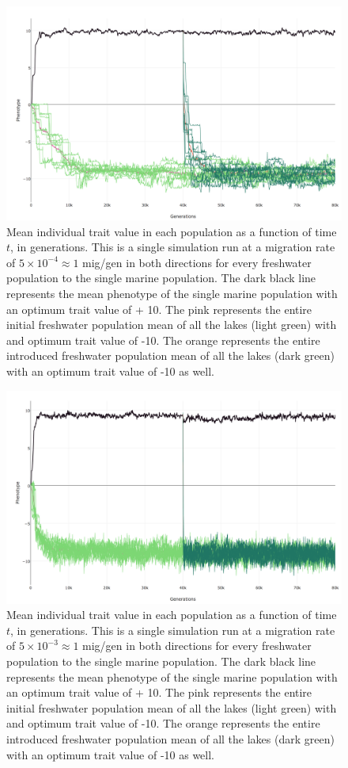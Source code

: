 \documentclass{article}
\begin{document}
\begin{figure}
	\begin{center}
  		\includegraphics[width=0.7\linewidth]{plotlyPlots/PhenotypeThroughout5e-4.png}
  		\caption{ Mean individual trait value in each population as a function of time $t$, in generations. 
		This is a single simulation run at a migration rate of $5 \times 10^{-4} \approx 1$ mig/gen in both 
		directions for every freshwater population to the single marine population. 
		The dark black line represents the mean phenotype of the single marine population with an optimum trait value of + 10. 
		The pink represents the entire initial freshwater population mean
		of all the lakes (light green) with and optimum trait value of -10.
		The orange represents the entire introduced freshwater population mean
		of all the lakes (dark green) with an optimum trait value of -10 as well.
		}
  		\label{fig:phenotype_ts2}
	\end{center}
\end{figure}

\begin{figure}
	\begin{center}
  		\includegraphics[width=0.7\linewidth]{plotlyPlots/PhenotypeThroughout5e-3.png}
  		\caption{Mean individual trait value in each population as a function of time $t$, in generations. 
		This is a single simulation run at a migration rate of $5 \times 10^{-3} \approx 1$ mig/gen in both 
		directions for every freshwater population to the single marine population. 
		The dark black line represents the mean phenotype of the single marine population with an optimum trait value of + 10. 
		The pink represents the entire initial freshwater population mean
		of all the lakes (light green) with and optimum trait value of -10.
		The orange represents the entire introduced freshwater population mean
		of all the lakes (dark green) with an optimum trait value of -10 as well.
		}
  		\label{fig:phenotype_ts3}
	\end{center}
\end{figure}
\end{document}
